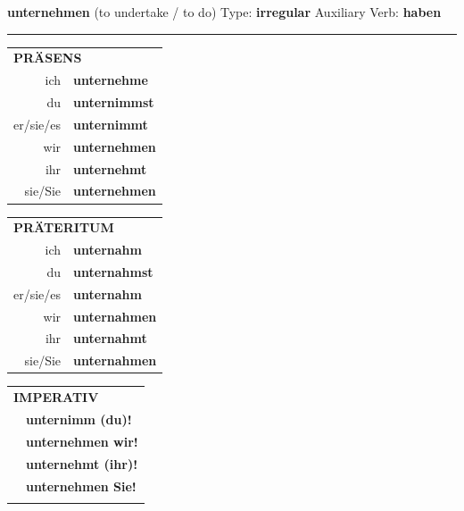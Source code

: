\documentclass[10pt,a4paper]{revtex4-2}
\begin{document}
\begin{verbbox}
    {\Large \bf unternehmen} (to undertake / to do) \hfill Type: \textbf{irregular} \hfill Auxiliary Verb: \textbf{haben} 
    
     \vspace{5pt}

    \hrule
    
    \vspace{5pt}

  \begin{tabular}{rl}
     \multicolumn{2}{l}{\textbf{PRÄSENS} }\\
    ich & \textbf{unternehme}\\
    du & \textbf{unternimmst}\\
    er/sie/es & \textbf{unternimmt}\\
    wir & \textbf{unternehmen}\\
    ihr & \textbf{unternehmt}\\
    sie/Sie & \textbf{unternehmen}\\
  \end{tabular}
  \hfill
     \begin{tabular}{rl}
    \multicolumn{2}{l}{\textbf{PRÄTERITUM} }\\
    ich & \textbf{unternahm}\\
    du & \textbf{unternahmst}\\
    er/sie/es & \textbf{unternahm}\\
    wir & \textbf{unternahmen}\\
    ihr & \textbf{unternahmt}\\
    sie/Sie & \textbf{unternahmen}\\
  \end{tabular}
  \hfill
  \begin{tabular}{rl}
     \multicolumn{2}{l}{\textbf{IMPERATIV} }\\
   & \textbf{unternimm (du)!}\\
   & \textbf{unternehmen wir!}\\
   & \textbf{unternehmt (ihr)!}\\
   & \textbf{unternehmen Sie!}\\
   & \vspace{10pt}
  \end{tabular}

    \vspace{10pt}


\end{verbbox}
\end{document}

